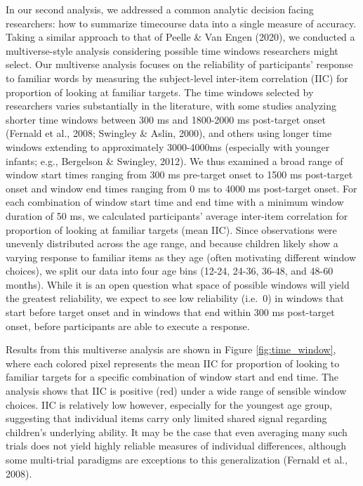 \documentclass[10pt, letterpaper]{article}
\begin{document}
In our second analysis, we addressed a common analytic decision facing
researchers: how to summarize timecourse data into a single measure of
accuracy. Taking a similar approach to that of Peelle \& Van Engen
(2020), we conducted a multiverse-style analysis considering possible
time windows researchers might select. Our multiverse analysis focuses
on the reliability of participants' response to familiar words by
measuring the subject-level inter-item correlation (IIC) for proportion
of looking at familiar targets. The time windows selected by researchers
varies substantially in the literature, with some studies analyzing
shorter time windows between 300 ms and 1800-2000 ms post-target onset
(Fernald et al., 2008; Swingley \& Aslin, 2000), and others using longer
time windows extending to approximately 3000-4000ms (especially with
younger infants; e.g., Bergelson \& Swingley, 2012). We thus examined a
broad range of window start times ranging from 300 ms pre-target onset
to 1500 ms post-target onset and window end times ranging from 0 ms to
4000 ms post-target onset. For each combination of window start time and
end time with a minimum window duration of 50 ms, we calculated
participants' average inter-item correlation for proportion of looking
at familiar targets (mean IIC). Since observations were unevenly
distributed across the age range, and because children likely show a
varying response to familiar items as they age (often motivating
different window choices), we split our data into four age bins (12-24,
24-36, 36-48, and 48-60 months). While it is an open question what space
of possible windows will yield the greatest reliability, we expect to
see low reliability (i.e.~0) in windows that start before target onset
and in windows that end within 300 ms post-target onset, before
participants are able to execute a response.

Results from this multiverse analysis are shown in Figure
\ref{fig:time_window}, where each colored pixel represents the mean IIC
for proportion of looking to familiar targets for a specific combination
of window start and end time. The analysis shows that IIC is positive
(red) under a wide range of sensible window choices. IIC is relatively
low however, especially for the youngest age group, suggesting that
individual items carry only limited shared signal regarding children's
underlying ability. It may be the case that even averaging many such
trials does not yield highly reliable measures of individual
differences, although some multi-trial paradigms are exceptions to this
generalization (Fernald et al., 2008).
\end{document}
